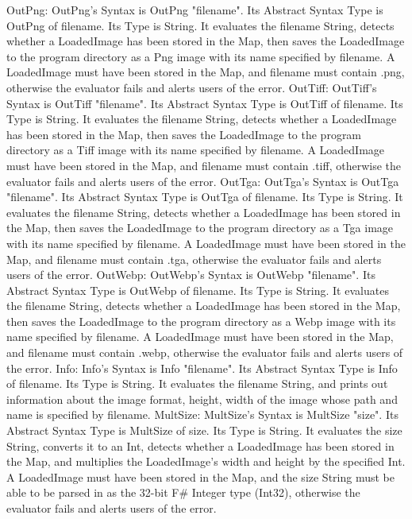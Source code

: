 \documentclass{article}
\begin{document}
\vskip 0.2in
OutPng: OutPng's Syntax is OutPng "filename". Its Abstract Syntax Type is OutPng of filename. Its Type is String. It evaluates the filename String, detects whether a LoadedImage has been stored in the Map, then saves the LoadedImage to the program directory as a Png image with its name specified by filename. A LoadedImage must have been stored in the Map, and filename must contain .png, otherwise the evaluator fails and alerts users of the error.
\vskip 0.2in
OutTiff: OutTiff's Syntax is OutTiff "filename". Its Abstract Syntax Type is OutTiff of filename. Its Type is String. It evaluates the filename String, detects whether a LoadedImage has been stored in the Map, then saves the LoadedImage to the program directory as a Tiff image with its name specified by filename. A LoadedImage must have been stored in the Map, and filename must contain .tiff, otherwise the evaluator fails and alerts users of the error.
\vskip 0.2in
OutTga: OutTga's Syntax is OutTga "filename". Its Abstract Syntax Type is OutTga of filename. Its Type is String. It evaluates the filename String, detects whether a LoadedImage has been stored in the Map, then saves the LoadedImage to the program directory as a Tga image with its name specified by filename. A LoadedImage must have been stored in the Map, and filename must contain .tga, otherwise the evaluator fails and alerts users of the error.
\vskip 0.2in
OutWebp: OutWebp's Syntax is OutWebp "filename". Its Abstract Syntax Type is OutWebp of filename. Its Type is String. It evaluates the filename String, detects whether a LoadedImage has been stored in the Map, then saves the LoadedImage to the program directory as a Webp image with its name specified by filename. A LoadedImage must have been stored in the Map, and filename must contain .webp, otherwise the evaluator fails and alerts users of the error.
\vskip 0.2in
Info: Info's Syntax is Info "filename". Its Abstract Syntax Type is Info of filename. Its Type is String. It evaluates the filename String, and prints out information about the image format, height, width of the image whose path and name is specified by filename.
\vskip 0.2in
MultSize: MultSize's Syntax is MultSize "size". Its Abstract Syntax Type is MultSize of size. Its Type is String. It evaluates the size String, converts it to an Int, detects whether a LoadedImage has been stored in the Map, and multiplies the LoadedImage's width and height by the specified Int. A LoadedImage must have been stored in the Map, and the size String must be able to be parsed in as the 32-bit F\# Integer type (Int32), otherwise the evaluator fails and alerts users of the error.
\end{document}
